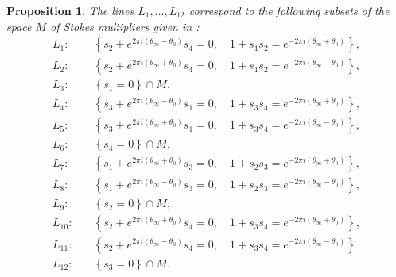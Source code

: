 \documentclass[a4paper,reqno]{amsart}
\numberwithin{equation}{section}
\newtheorem{proposition}[theorem]{Proposition}
\numberwithin{equation}{section}
\begin{document}
\begin{proposition}\label{prop:curves_explained}
    The lines $L_1,\dots,L_{12}$ correspond to the following subsets of the space $M$ of Stokes multipliers given in :
    \begin{equation}\label{eq:stokesdatalinesPIV}
        \begin{aligned}
            L_1 : &\quad  \left\{s_2 + e^{2\pi i( \theta_{\infty}-\theta_{0}) } s_4 = 0, 
            \quad 1 + s_1s_2 = e^{-2\pi i (\theta_{\infty}+\theta_0)} \right\}, \\
            L_2 : &\quad  \left\{ s_2 + e^{2\pi i( \theta_{\infty}+\theta_{0}) } s_4 = 0,
            \quad 1 + s_1s_2 = e^{-2\pi i (\theta_{\infty}-\theta_0)} \right\},\\
            L_3 : &\quad \left\{ s_1=0 \right\}\cap M, \\
            L_4 : &\quad  \left\{s_3 + e^{2\pi i( \theta_{\infty}-\theta_{0}) } s_1 = 0, 
            \quad 1 + s_3s_4= e^{-2\pi i (\theta_{\infty}+\theta_0)} \right\}, \\
            L_5 : &\quad  \left\{s_3 + e^{2\pi i( \theta_{\infty}+\theta_{0}) } s_1 = 0, 
            \quad 1 + s_3s_4= e^{-2\pi i (\theta_{\infty}-\theta_0)} \right\}, \\
            L_6 : &\quad \left\{ s_4=0 \right\}\cap M, \\
            L_7 : &\quad \left\{s_1 + e^{2\pi i( \theta_{\infty}+\theta_0) } s_3 = 0, 
            \quad 1 + s_2 s_3 = e^{-2\pi i (\theta_{\infty}+\theta_{0})}\right\}, \\
            L_8 : &\quad \left\{s_1 + e^{2\pi i( \theta_{\infty}-\theta_0) } s_3 = 0, 
            \quad 1 + s_2 s_3 = e^{-2\pi i (\theta_{\infty}-\theta_{0})}\right\},\\
            L_9 : &\quad \left\{ s_2=0\right\} \cap M,\\
            L_{10} : &\quad \left\{ s_2 + e^{2\pi i( \theta_{\infty}+\theta_0) } s_4 = 0,
            \quad  1 + s_3 s_4 = e^{-2\pi i (\theta_{\infty}+\theta_{0})}\right\}, \\
            L_{11} : &\quad \left\{ s_2 + e^{2\pi i( \theta_{\infty}-\theta_0) } s_4 = 0,
            \quad  1 + s_3 s_4 = e^{-2\pi i (\theta_{\infty}-\theta_{0})}\right\} \\
            L_{12} : &\quad \left\{ s_3=0\right\} \cap M.            
        \end{aligned}
    \end{equation}

\end{proposition}
\end{document}
